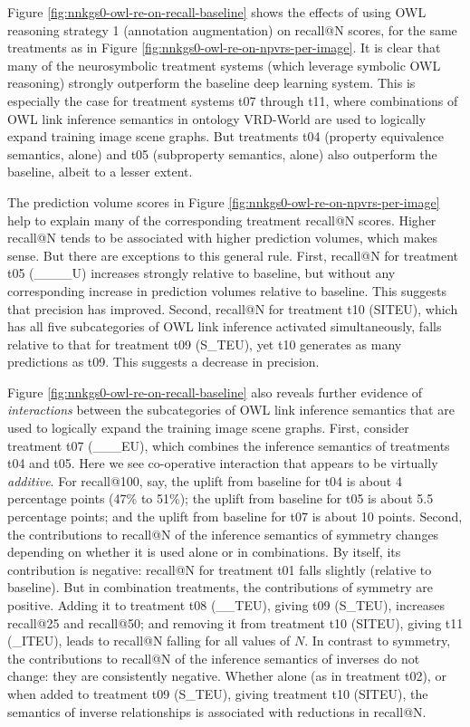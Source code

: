 \documentclass[]{jair}
\begin{document}
Figure \ref{fig:nnkgs0-owl-re-on-recall-baseline} shows the effects of using OWL reasoning strategy 1 (annotation augmentation) on recall@N scores, for the same treatments as in Figure \ref{fig:nnkgs0-owl-re-on-npvrs-per-image}.
It is clear that many of the neurosymbolic treatment systems (which leverage symbolic OWL reasoning) strongly outperform the baseline deep learning system.
This is especially the case for treatment systems t07 through t11, where combinations of OWL link inference semantics in ontology VRD-World are used to logically expand training image scene graphs.
But treatments t04 (property equivalence semantics, alone) and t05 (subproperty semantics, alone) also outperform the baseline, albeit to a lesser extent.

The prediction volume scores in Figure \ref{fig:nnkgs0-owl-re-on-npvrs-per-image} help to explain many of the corresponding treatment recall@N scores.
Higher recall@N tends to be associated with higher prediction volumes, which makes sense.
But there are exceptions to this general rule.
First, recall@N for treatment t05 (\_\_\_\_U) increases strongly relative to baseline, but without any corresponding increase in prediction volumes relative to baseline.
This suggests that precision has improved.
Second, recall@N for treatment t10 (SITEU), which has all five subcategories of OWL link inference activated simultaneously, falls relative to that for treatment t09 (S\_TEU), yet t10 generates as many predictions as t09.
This suggests a decrease in precision.

Figure \ref{fig:nnkgs0-owl-re-on-recall-baseline} also reveals further evidence of \emph{interactions} between the subcategories of OWL link inference semantics that are used to logically expand the training image scene graphs.
First, consider treatment t07 (\_\_\_EU), which combines the inference semantics of treatments t04 and t05.
Here we see co-operative interaction that appears to be virtually \emph{additive}.
For recall@100, say, the uplift from baseline for t04 is about 4 percentage points (47\% to 51\%); the uplift from baseline for t05 is about 5.5 percentage points; and the uplift from baseline for t07 is about 10 points.
Second, the contributions to recall@N of the inference semantics of symmetry changes depending on whether it is used alone or in combinations.
By itself, its contribution is negative: recall@N for treatment t01 falls slightly (relative to baseline).
But in combination treatments, the contributions of symmetry are positive.
Adding it to treatment t08 (\_\_TEU), giving t09 (S\_TEU), increases recall@25 and recall@50; and removing it from treatment t10 (SITEU), giving t11 (\_ITEU), leads to recall@N falling for all values of $N$.
In contrast to symmetry, the contributions to recall@N of the inference semantics of inverses do not change: they are consistently negative.
Whether alone (as in treatment t02), or when added to treatment t09 (S\_TEU), giving treatment t10 (SITEU), the semantics of inverse relationships is associated with reductions in recall@N.
\end{document}
